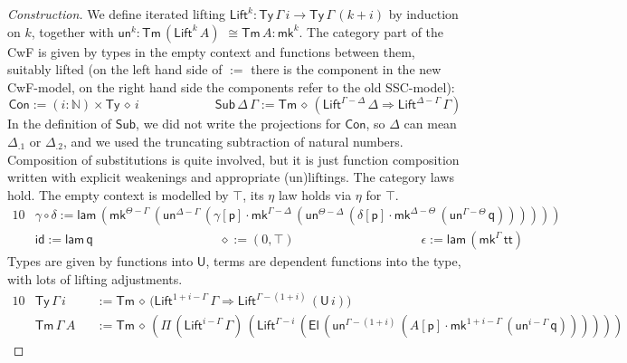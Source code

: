 \documentclass[a4paper,UKenglish]{article}
\newcommand{\ra}{\rightarrow}
\newcommand{\Ra}{\Rightarrow}
\newcommand{\Ty}{\mathsf{Ty}}
\newcommand{\Tm}{\mathsf{Tm}}
\newcommand{\Con}{\mathsf{Con}}
\newcommand{\Sub}{\mathsf{Sub}}
\newcommand{\p}{\mathsf{p}}
\newcommand{\q}{\mathsf{q}}
\newcommand{\N}{\mathbb{N}}
\newcommand{\lam}{\mathsf{lam}}
\newcommand{\U}{\mathsf{U}}
\newcommand{\El}{\mathsf{El}}
\renewcommand{\tt}{\mathsf{tt}}
\newcommand{\Lift}{\mathsf{Lift}}
\newcommand{\mk}{\mathsf{mk}}
\newcommand{\un}{\mathsf{un}}
\newcommand{\id}{\mathsf{id}}
\begin{document}
\begin{proof}[Construction]
  We define iterated lifting $\Lift^k :
  \Ty\,\Gamma\,i\ra\Ty\,\Gamma\,(k+i)$ by induction on $k$, together
  with $\un^k : \Tm\,(\Lift^k\,A)$ $\cong\Tm\,A : \mk^k$. The category %
  part of the CwF is given by types in the empty context and functions
  between them, suitably lifted (on the left hand side of $:=$ there
  is the component in the new CwF-model, on the right hand side the
  components refer to the old SSC-model):
  \[
    \Con := (i:\N)\times\Ty\,\diamond\,i \hspace{6em}
    \Sub\,\Delta\,\Gamma := \Tm\,\diamond\,(\Lift^{\Gamma-\Delta}\,\Delta\Ra\Lift^{\Delta-\Gamma}\,\Gamma)
  \]
  In the definition of $\Sub$, we did not write the projections for
  $\Con$, so $\Delta$ can mean $\Delta_{.1}$ or $\Delta_{.2}$, and we used the truncating subtraction of
  natural numbers. Composition of substitutions is quite involved, but
  it is just function composition written with explicit weakenings and
  appropriate (un)liftings. The category laws hold. The empty context is
  modelled by $\top$, its $\eta$ law holds via $\eta$ for $\top$.
  \begin{alignat*}{10}
    & \gamma\circ\delta := \lam\,(\mk^{\Theta-\Gamma}\,(\un^{\Delta-\Gamma}\,(\gamma[\p]\cdot\mk^{\Gamma-\Delta}\,(\un^{\Theta-\Delta}\,(\delta[\p]\cdot\mk^{\Delta-\Theta}\,(\un^{\Gamma-\Theta}\,\q)))))) \\
    & \id := \lam\,\q \hspace{10em} \diamond := (0,\top) \hspace{10em} \epsilon := \lam\,(\mk^\Gamma\,\tt)
  \end{alignat*}
  Types are given by functions into $\U$, terms are dependent
  functions into the type, with lots of lifting adjustments.
  \begin{alignat*}{10}
    & \Ty\,\Gamma\,i && := \Tm\,\diamond\,\big(\Lift^{1+i-\Gamma}\,\Gamma\Ra\Lift^{\Gamma-(1+i)}\,(\U\,i)\big) \\
    & \Tm\,\Gamma\,A && := \Tm\,\diamond\,(\Pi\,(\Lift^{i-\Gamma}\,\Gamma)\,(\Lift^{\Gamma-i}\,(\El\,(\un^{\Gamma-(1+i)}\,(A[\p]\cdot\mk^{1+i-\Gamma}\,(\un^{i-\Gamma}\,\q))))))

\end{alignat*}
\end{proof}
\end{document}
